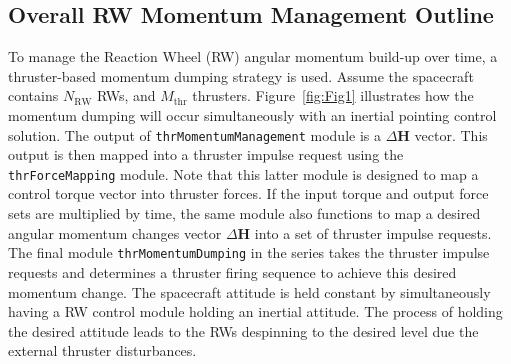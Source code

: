 \documentclass[]{BasiliskReportMemo}
\begin{document}
\subsection{Overall RW Momentum Management Outline}
To manage the Reaction Wheel (RW) angular momentum build-up over time, a thruster-based momentum dumping strategy is used. Assume the spacecraft contains $N_{\text{RW}}$ RWs, and $M_{\text{thr}}$ thrusters.  Figure~\ref{fig:Fig1} illustrates how the momentum dumping will occur simultaneously with an inertial pointing control solution.   The output of {\tt thrMomentumManagement} module is a $\Delta \bm H$ vector.  This output is then mapped into a thruster impulse request using the {\tt thrForceMapping} module.  Note that this latter module is designed to map a control torque vector into thruster forces.  If the input torque and output force sets are multiplied by time,  the same module also functions to map a desired angular momentum changes vector $\Delta \bm H$ into a set of thruster impulse requests.  The final module {\tt thrMomentumDumping} in the series takes the thruster impulse requests and determines a thruster firing sequence to achieve this desired momentum change.  The spacecraft attitude is held constant by simultaneously having a RW control module holding an inertial attitude.  The process of holding the desired attitude leads to the RWs despinning to the desired level due the external thruster disturbances.  
\end{document}
